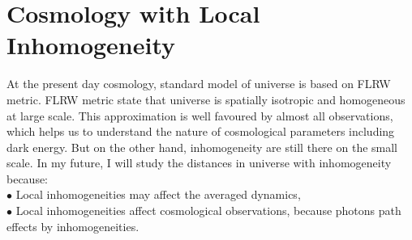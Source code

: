 \documentclass[12pt]{report}
\begin{document}
\section{Cosmology with  Local Inhomogeneity }
At the present day cosmology, standard model of universe is based on FLRW metric. FLRW metric state that universe is spatially isotropic and homogeneous at large scale. This approximation is well favoured by almost all observations, which helps us to understand the nature of cosmological parameters including dark energy.  But on the other hand, inhomogeneity are still there on the small scale. In my future, I will study the distances in  universe with inhomogeneity because: 
\vspace{2mm}\\
$\bullet$ Local inhomogeneities may affect the averaged dynamics,\\
$\bullet$ Local inhomogeneities affect cosmological observations, because photons path effects by inhomogeneities.
\end{document}
